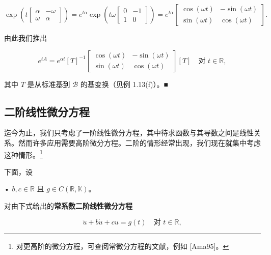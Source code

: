 \begin{remark}
\begin{items}
\begin{equation*}
\exp\left( t\begin{bmatrix} \alpha & -\omega \\ \omega & \alpha \end{bmatrix} \right) = e^{t\alpha}\exp\left( t\omega\begin{bmatrix} 0 & -1 \\ 1 & 0 \end{bmatrix} \right) = e^{t\alpha}\begin{bmatrix} \cos(\omega t) & -\sin(\omega t) \\ \sin(\omega t) & \cos(\omega t) \end{bmatrix} .
\end{equation*}

由此我们推出

\begin{equation*}
e^{tA} = e^{\alpha t}[T]^{-1}\begin{bmatrix} \cos(\omega t) & -\sin(\omega t) \\ \sin(\omega t) & \cos(\omega t) \end{bmatrix}[T] \quad \text{对 } t \in \mathbb{R} ,
\end{equation*}

其中 $ T $ 是从标准基到 $ \mathcal{B} $ 的基变换（见例 1.13(f)）。\nobreak\hspace{0.35em}■

\end{items}

\end{remark}

\subsection*{二阶线性微分方程}

迄今为止，我们只考虑了一阶线性微分方程，其中待求函数与其导数之间是线性关系。然而许多应用需要高阶微分方程。二阶的情形经常出现，我们现在就集中考虑这种情形。\footnote{对更高阶的微分方程，可查阅常微分方程的文献，例如 [Ama95]。}

下面，设

• $ b, c \in \mathbb{R} $ 且 $ g \in C(\mathbb{R}, \mathbb{K}) $。

对由下式给出的\textbf{常系数二阶线性微分方程}

\begin{equation}
\ddot{u} + b\dot{u} + cu = g(t) \quad \text{对 } t \in \mathbb{R} ,\tag{1.27}
\end{equation}

